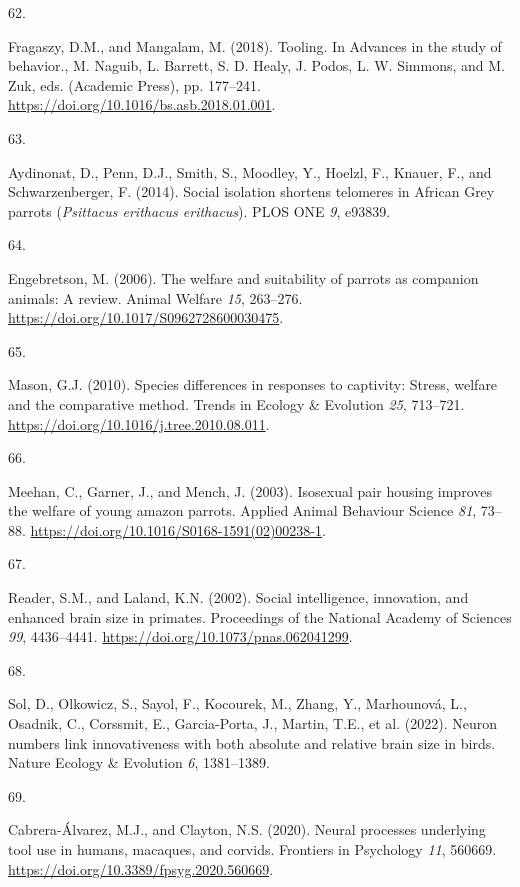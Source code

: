 \documentclass[
  man, donotrepeattitle,floatsintext]{apa6}
\newlength{\cslhangindent}
\newlength{\csllabelwidth}
\newlength{\cslentryspacingunit} %
\newenvironment{CSLReferences}[2] %
 {%
  \setlength{\parindent}{0pt}
  \ifodd #1
  \let\oldpar\par
  \def\par{\hangindent=\cslhangindent\oldpar}
  \fi
  \setlength{\parskip}{#2\cslentryspacingunit}
 }%
 {}
\newcommand{\CSLLeftMargin}[1]{\parbox[t]{\csllabelwidth}{#1}}
\newcommand{\CSLRightInline}[1]{\parbox[t]{\linewidth - \csllabelwidth}{#1}\break}
\begin{document}
\begin{CSLReferences}{0}{0}
\leavevmode{}%
\CSLLeftMargin{62. }%
\CSLRightInline{Fragaszy, D.M., and Mangalam, M. (2018). Tooling. In Advances in the study of behavior., M. Naguib, L. Barrett, S. D. Healy, J. Podos, L. W. Simmons, and M. Zuk, eds. (Academic Press), pp. 177--241. \url{https://doi.org/10.1016/bs.asb.2018.01.001}.}

\leavevmode{}%
\CSLLeftMargin{63. }%
\CSLRightInline{Aydinonat, D., Penn, D.J., Smith, S., Moodley, Y., Hoelzl, F., Knauer, F., and Schwarzenberger, F. (2014). Social isolation shortens telomeres in {A}frican {G}rey parrots (\emph{{P}sittacus erithacus erithacus}). PLOS ONE \emph{9}, e93839.}

\leavevmode{}%
\CSLLeftMargin{64. }%
\CSLRightInline{Engebretson, M. (2006). The welfare and suitability of parrots as companion animals: A review. Animal Welfare \emph{15}, 263--276. \url{https://doi.org/10.1017/S0962728600030475}.}

\leavevmode{}%
\CSLLeftMargin{65. }%
\CSLRightInline{Mason, G.J. (2010). Species differences in responses to captivity: Stress, welfare and the comparative method. Trends in Ecology \& Evolution \emph{25}, 713--721. \url{https://doi.org/10.1016/j.tree.2010.08.011}.}

\leavevmode{}%
\CSLLeftMargin{66. }%
\CSLRightInline{Meehan, C., Garner, J., and Mench, J. (2003). Isosexual pair housing improves the welfare of young amazon parrots. Applied Animal Behaviour Science \emph{81}, 73--88. \url{https://doi.org/10.1016/S0168-1591(02)00238-1}.}

\leavevmode{}%
\CSLLeftMargin{67. }%
\CSLRightInline{Reader, S.M., and Laland, K.N. (2002). Social intelligence, innovation, and enhanced brain size in primates. Proceedings of the National Academy of Sciences \emph{99}, 4436--4441. \url{https://doi.org/10.1073/pnas.062041299}.}

\leavevmode{}%
\CSLLeftMargin{68. }%
\CSLRightInline{Sol, D., Olkowicz, S., Sayol, F., Kocourek, M., Zhang, Y., Marhounová, L., Osadnik, C., Corssmit, E., Garcia-Porta, J., Martin, T.E., et al. (2022). Neuron numbers link innovativeness with both absolute and relative brain size in birds. Nature Ecology \& Evolution \emph{6}, 1381--1389.}

\leavevmode{}%
\CSLLeftMargin{69. }%
\CSLRightInline{Cabrera-Álvarez, M.J., and Clayton, N.S. (2020). Neural processes underlying tool use in humans, macaques, and corvids. Frontiers in Psychology \emph{11}, 560669. \url{https://doi.org/10.3389/fpsyg.2020.560669}.}


\end{CSLReferences}
\end{document}

